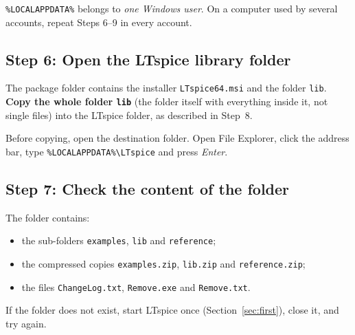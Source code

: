 \begin{tipbox}
\texttt{\%LOCALAPPDATA\%} belongs to \emph{one Windows user}. On a computer used by several accounts,
repeat Steps 6--9 in every account.
\end{tipbox}

\subsection{Step 6: Open the LTspice library folder}
The package folder contains the installer \texttt{LTspice64.msi} and the folder \texttt{lib}.
\textbf{Copy the whole folder \texttt{lib}} (the folder itself with everything inside it, not single
files) into the LTspice folder, as described in Step~8.

Before copying, open the destination folder. Open File Explorer, click the address bar, type
\texttt{\%LOCALAPPDATA\%\textbackslash LTspice} and press \textit{Enter}.

\subsection{Step 7: Check the content of the folder}
The folder contains:
\begin{itemize}[itemsep=1pt]
  \item the sub-folders \texttt{examples}, \texttt{lib} and \texttt{reference};
  \item the compressed copies \texttt{examples.zip}, \texttt{lib.zip} and \texttt{reference.zip};
  \item the files \texttt{ChangeLog.txt}, \texttt{Remove.exe} and \texttt{Remove.txt}.
\end{itemize}
If the folder does not exist, start LTspice once (Section~\ref{sec:first}), close it, and try again.

